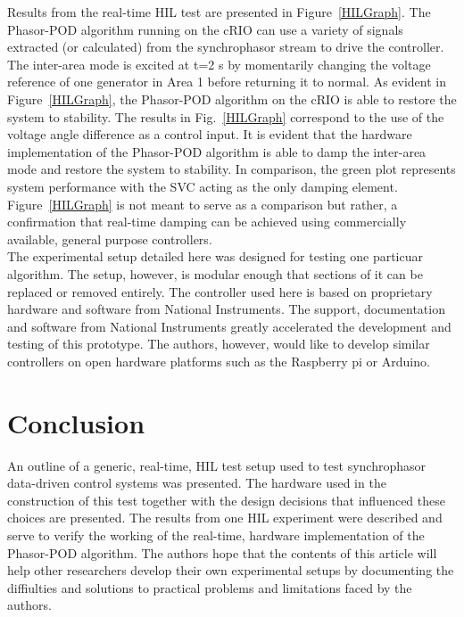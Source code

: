 \documentclass[conference]{IEEEtran}
\begin{document}
Results from the real-time HIL test are presented in Figure~\ref{HILGraph}. The Phasor-POD algorithm running on the cRIO can use a variety of signals extracted (or calculated) from the synchrophasor stream to drive the controller. The inter-area mode is excited at t=2 s by momentarily changing the voltage reference of one generator in Area 1 before returning it to normal. As evident in Figure~\ref{HILGraph}, the Phasor-POD algorithm on the cRIO is able to restore the system to stability. The results in Fig.~\ref{HILGraph} correspond to the use of the voltage angle difference as a control input. It is evident that the hardware implementation of the Phasor-POD algorithm is able to damp the inter-area mode and restore the system to stability. In comparison, the green plot represents system performance with the SVC acting as the only damping element. Figure~\ref{HILGraph} is not meant to serve as a comparison but rather, a confirmation that real-time damping can be achieved using commercially available, general purpose controllers.\\

The experimental setup detailed here was designed for testing one particuar algorithm. The setup, however, is modular enough that sections of it can be replaced or removed entirely. The controller used here is based on proprietary hardware and software from National Instruments. The support, documentation and software from National Instruments greatly accelerated the development and testing of this prototype. The authors, however, would like to develop similar controllers on open hardware platforms such as the Raspberry pi or Arduino.



\section{Conclusion} \label{conclusion}
An outline of a generic, real-time, HIL test setup used to test synchrophasor data-driven control systems was presented. The hardware used in the construction of this test together with the design decisions that influenced these choices are presented. The results from one HIL experiment were described and serve to verify the working of the real-time, hardware implementation of the Phasor-POD algorithm. The authors hope that the contents of this article will help other researchers develop their own experimental setups by documenting the diffiulties and solutions to practical problems and limitations faced by the authors.
\end{document}
